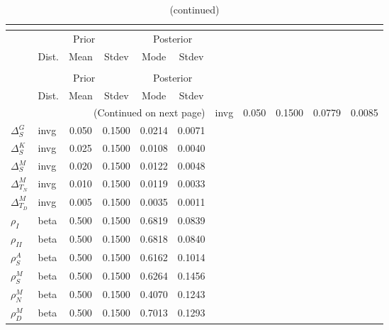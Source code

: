  
\begin{center}
\begin{longtable}{llcccc} 
\caption{Results from posterior maximization (parameters)}\\
 \label{Table:Posterior:1}\\
\toprule 
  & \multicolumn{3}{c}{Prior}  &  \multicolumn{2}{c}{Posterior} \\
  \cmidrule(r{.75em}){2-4} \cmidrule(r{.75em}){5-6}
  & Dist. & Mean  & Stdev & Mode & Stdev \\ 
\midrule \endfirsthead 
\caption{(continued)}\\
 \bottomrule 
  & \multicolumn{3}{c}{Prior}  &  \multicolumn{2}{c}{Posterior} \\
  \cmidrule(r{.75em}){2-4} \cmidrule(r{.75em}){5-6}
  & Dist. & Mean  & Stdev & Mode & Stdev \\ 
\midrule \endhead 
\bottomrule \multicolumn{6}{r}{(Continued on next page)}\endfoot 
\bottomrule\endlastfoot 
${\Delta^{A}_{S}}$ & invg &   0.050 & 0.1500 &   0.0779 &  0.0085 \\ 
${\Delta^{G}_{S}}$ & invg &   0.050 & 0.1500 &   0.0214 &  0.0071 \\ 
${\Delta^{K}_{S}}$ & invg &   0.025 & 0.1500 &   0.0108 &  0.0040 \\ 
${\Delta^{M}_{S}}$ & invg &   0.020 & 0.1500 &   0.0122 &  0.0048 \\ 
${\Delta^{M}_{T_N}}$ & invg &   0.010 & 0.1500 &   0.0119 &  0.0033 \\ 
${\Delta^{M}_{T_D}}$ & invg &   0.005 & 0.1500 &   0.0035 &  0.0011 \\ 
${\rho_{I}}$ & beta &   0.500 & 0.1500 &   0.6819 &  0.0839 \\ 
${\rho_{II}}$ & beta &   0.500 & 0.1500 &   0.6818 &  0.0840 \\ 
${\rho^{A}_{S}}$ & beta &   0.500 & 0.1500 &   0.6162 &  0.1014 \\ 
${\rho^{M}_{S}}$ & beta &   0.500 & 0.1500 &   0.6264 &  0.1456 \\ 
${\rho^{M}_{N}}$ & beta &   0.500 & 0.1500 &   0.4070 &  0.1243 \\ 
${\rho^{M}_{D}}$ & beta &   0.500 & 0.1500 &   0.7013 &  0.1293 \\ 
\end{longtable}
 \end{center}
